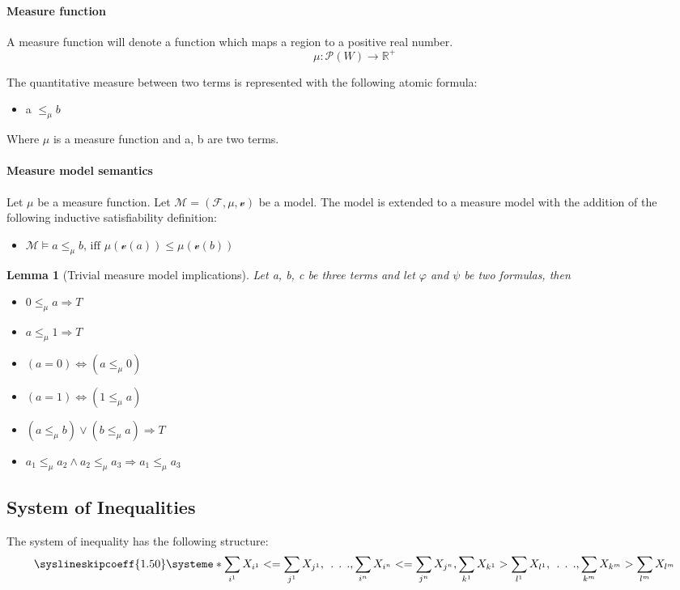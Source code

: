 \documentclass{article}
\newtheorem{lemma}[theorem]{Lemma}
\begin{document}
	\paragraph{Measure function} A measure function will denote a function which maps a region to a positive real number.
	\begin{equation*}
		\mu : \mathscr{P}(W) \longrightarrow \mathbb{R}^+
	\end{equation*}

	The quantitative measure between two terms is represented with the following atomic formula:
	\begin{itemize} 
		\item a $\le_\mu b$
	\end{itemize}
	Where $\mu$ is a measure function and a, b are two terms.
	
	\paragraph{Measure model semantics} Let $\mu$ be a measure function.
	Let  $\mathcal{M} = (\mathcal{F}, \mu, \mathscr{v})$ be a model. 
	The model is extended to a measure model with the addition of the following inductive satisfiability definition: 
	\begin{itemize}
		\item $\mathcal{M} \models a \leq_\mu b \text{, iff } \mu(\mathscr{v}(a)) \le \mu(\mathscr{v}(b))$
	\end{itemize}

\begin{lemma}[Trivial measure model implications]
Let a, b, c be three terms and let $\varphi$ and $\psi$ be two formulas, then
	\begin{itemize}
		\item $0 \le_\mu a \Longrightarrow T$
		\item $a \le_\mu 1 \Longrightarrow T$
		\item $(a = 0) \iff (a \le_\mu 0)$
		\item $(a = 1) \iff (1 \le_\mu a)$
		\item $(a \le_\mu b) \lor (b \le_\mu a) \Longrightarrow T$
		\item $a_1 \le_\mu a_2 \land a_2 \le_\mu a_3 \Longrightarrow a_1 \le_\mu a_3$
	\end{itemize}
\end{lemma}

	\newpage
	\subsection{System of Inequalities} 
		The system of inequality has the following structure:
		\[
			\syslineskipcoeff{1.50}
			\systeme*{\sum_{i^1} X_{i^1} <= \sum_{j^1} X_{j^1},
				\:\:.\:\:.\:\:.,
				\sum_{i^n} X_{i^n} <= \sum_{j^n} X_{j^n}, 
				\sum_{k^1} X_{k^1} > \sum_{l^1} X_{l^1},
				\:\:.\:\:.\:\:.,
				\sum_{k^m} X_{k^m} > \sum_{l^m} X_{l^m}
				}
		\]
\end{document}
